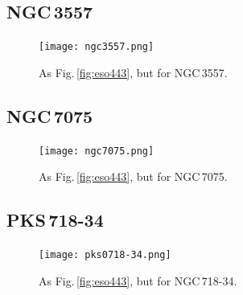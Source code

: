 \documentclass[a4paper,fleqn,usenatbib]{mnras}
\begin{document}
	\subsection{NGC\,3557}
		\begin{figure}
			\centering
			\texttt{[image: ngc3557.png]}
			\caption{As Fig.\,\ref{fig:eso443}, but for NGC\,3557.}
			\label{fig:ngc3557}
		\end{figure}

	\subsection{NGC\,7075}
		\begin{figure}
			\centering
			\texttt{[image: ngc7075.png]}
			\caption{As Fig.\,\ref{fig:eso443}, but for NGC\,7075.}
			\label{fig:ngc7075}
		\end{figure}

	\subsection{PKS\,718-34}
		\begin{figure}
			\centering
			\texttt{[image: pks0718-34.png]}
			\caption{As Fig.\,\ref{fig:eso443}, but for NGC\,718-34.}
			\label{fig:pks718}
		\end{figure}




\pagebreak
\end{document}
